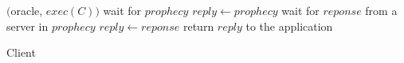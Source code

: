 \begin{algorithm}[h!]
\small

\begin{distribalgo}[1]



\vspace{1.0mm}
	\STATE \amcast$($oracle, $exec(C))$
	\STATE wait for $prophecy$
		\STATE $reply \leftarrow prophecy$
		\STATE wait for $reponse$ from a server in $prophecy$
		\STATE $reply \leftarrow reponse$
	\ENDIF
\STATE return $reply$ to the application
\ENDINDENT

\caption{Client}
\label{alg:client_proxy}
\end{distribalgo}
\end{algorithm}